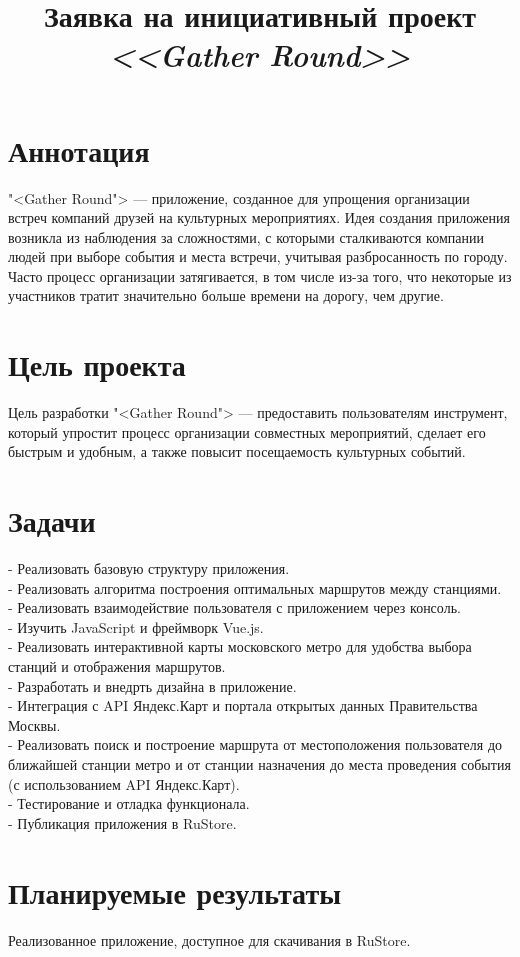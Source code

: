 \documentclass[a4paper,12pt]{extarticle}
\title{Заявка на инициативный проект \textit{<<Gather Round>>}}
\date{}
\begin{document}
\newpage
\setcounter{page}{1}
{
  \hypersetup{linkcolor=black}
}

\maketitle

\section{Аннотация}  
\noindent "<Gather Round"> — приложение, созданное для упрощения организации встреч компаний друзей на культурных мероприятиях. 
Идея создания приложения возникла из наблюдения за сложностями, с которыми сталкиваются компании людей при выборе события и места встречи, учитывая разбросанность по городу. 
Часто процесс организации затягивается, в том числе из-за того, что некоторые из участников тратит значительно больше времени на дорогу, чем другие.

\section{Цель проекта}
\noindent Цель разработки "<Gather Round"> — предоставить пользователям инструмент, который упростит процесс организации совместных мероприятий, сделает его быстрым и удобным, а также повысит посещаемость культурных событий.

\section{Задачи}
\noindent 
- Реализовать базовую структуру приложения. 
\\
- Реализовать алгоритма построения оптимальных маршрутов между станциями.
\\
- Реализовать взаимодействие пользователя с приложением через консоль.
\\
- Изучить JavaScript и фреймворк Vue.js.
\\
- Реализовать интерактивной карты московского метро для удобства выбора станций и отображения маршрутов.
\\
- Разработать и внедрть дизайна в приложение.
\\
- Интеграция с API Яндекс.Карт и портала открытых данных Правительства Москвы.
\\
- Реализовать поиск и построение маршрута от местоположения пользователя до ближайшей станции метро и от станции назначения до места проведения события 
(с использованием API Яндекс.Карт).
\\
- Тестирование и отладка функционала.
\\
- Публикация приложения в RuStore.

\section{Планируемые результаты} 
\noindent
Реализованное приложение, доступное для скачивания в RuStore.
\end{document}
